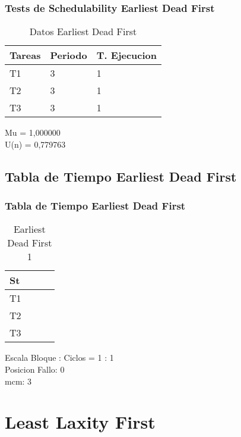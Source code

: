 \documentclass[xcolor=table]{beamer}
\begin{document}
\begin{frame} 
\frametitle{Tests de Schedulability  Earliest Dead First } 
\begin{table} 
\centering 
\begin{tabular}{|l|l|l|} 
\hline 
Tareas & Periodo & T. Ejecucion \\ \hline 
T1   & 3  &  1\\ \hline 
T2   & 3  &  1\\ \hline 
T3   & 3  &  1\\ \hline 
\end{tabular} 
\caption{Datos  Earliest Dead First } 
\end{table} 
Mu =  1,000000 \\ 
U(n) =  0,779763 \\ 
\end{frame} 

\subsection{Tabla de Tiempo  Earliest Dead First } 

\begin{frame} 
\frametitle{Tabla de Tiempo  Earliest Dead First } 
\begin{table} 
\centering 
\begin{tabular}{|l|l|l|l|} 
\hline 
St & \cellcolor{green} & \cellcolor{green} & \cellcolor{green} \\ \hline 
T1 & & & \cellcolor{blue} \\ \hline 
T2 & & \cellcolor{purple} & \\ \hline 
T3 & \cellcolor{cyan} & & \\ \hline 
\end{tabular} 
\caption{ Earliest Dead First 1 } 
\end{table} 
Escala Bloque : Ciclos = 1 : 1 \\ 
Posicion Fallo:  0 \\ 
mcm:  3 \\ 
\end{frame} 


\section{Least Laxity First}
\end{document}
